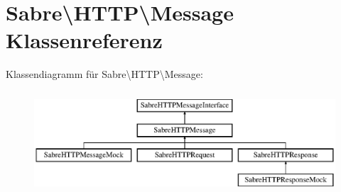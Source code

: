 \hypertarget{class_sabre_1_1_h_t_t_p_1_1_message}{}\section{Sabre\textbackslash{}H\+T\+TP\textbackslash{}Message Klassenreferenz}
\label{class_sabre_1_1_h_t_t_p_1_1_message}
Klassendiagramm für Sabre\textbackslash{}H\+T\+TP\textbackslash{}Message\+:\begin{figure}[H]
\begin{center}
\leavevmode
\includegraphics[height=3.848797cm]{class_sabre_1_1_h_t_t_p_1_1_message}
\end{center}
\end{figure}
